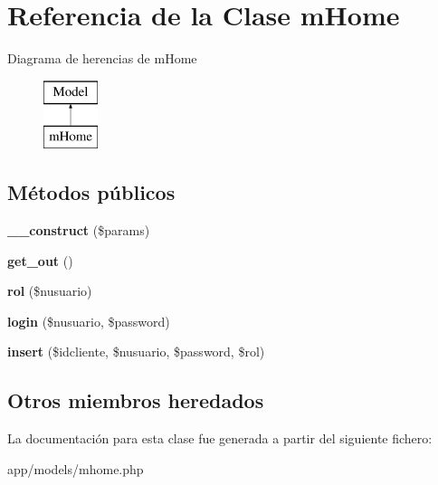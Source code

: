 \hypertarget{classm_home}{}\section{Referencia de la Clase m\+Home}
\label{classm_home}
Diagrama de herencias de m\+Home\begin{figure}[H]
\begin{center}
\leavevmode
\includegraphics[height=2.000000cm]{classm_home}
\end{center}
\end{figure}
\subsection*{Métodos públicos}
\begin{DoxyCompactItemize}
\item 
\hypertarget{classm_home_a9162320adff1a1a4afd7f2372f753a3e}{}{\bfseries \+\_\+\+\_\+construct} (\$params)\label{classm_home_a9162320adff1a1a4afd7f2372f753a3e}

\item 
\hypertarget{classm_home_aa67567dc404200190a6abcae9262dba0}{}{\bfseries get\+\_\+out} ()\label{classm_home_aa67567dc404200190a6abcae9262dba0}

\item 
\hypertarget{classm_home_a3309f05cc3c0ac88c2ba466248d1d507}{}{\bfseries rol} (\$nusuario)\label{classm_home_a3309f05cc3c0ac88c2ba466248d1d507}

\item 
\hypertarget{classm_home_a1db2d12d379fffc4b5ae574167a1a799}{}{\bfseries login} (\$nusuario, \$password)\label{classm_home_a1db2d12d379fffc4b5ae574167a1a799}

\item 
\hypertarget{classm_home_a8fffd933aba0b9d7b1f927b2caca6966}{}{\bfseries insert} (\$idcliente, \$nusuario, \$password, \$rol)\label{classm_home_a8fffd933aba0b9d7b1f927b2caca6966}

\end{DoxyCompactItemize}
\subsection*{Otros miembros heredados}


La documentación para esta clase fue generada a partir del siguiente fichero\+:\begin{DoxyCompactItemize}
\item 
app/models/mhome.\+php\end{DoxyCompactItemize}
